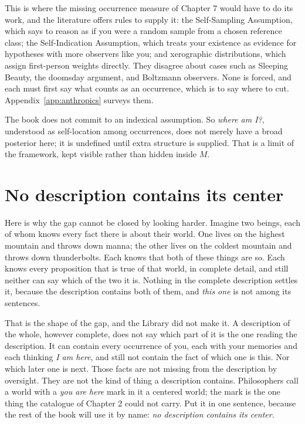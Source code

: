 This is where the missing occurrence measure of Chapter 7 would have to do its work, and the literature offers rules to supply it: the Self-Sampling Assumption, which says to reason as if you were a random sample from a chosen reference class; the Self-Indication Assumption, which treats your existence as evidence for hypotheses with more observers like you; and xerographic distributions, which assign first-person weights directly. They disagree about cases such as Sleeping Beauty, the doomsday argument, and Boltzmann observers. None is forced, and each must first say what counts as an occurrence, which is to say where to cut. Appendix~\ref{app:anthropics} surveys them.

The book does not commit to an indexical assumption. So \emph{where am I?}, understood as self-location among occurrences, does not merely have a broad posterior here; it is undefined until extra structure is supplied. That is a limit of the framework, kept visible rather than hidden inside $M$.

\section*{No description contains its center}

Here is why the gap cannot be closed by looking harder. Imagine two beings, each of whom knows every fact there is about their world. One lives on the highest mountain and throws down manna; the other lives on the coldest mountain and throws down thunderbolts. Each knows that both of these things are so. Each knows every proposition that is true of that world, in complete detail, and still neither can say which of the two it is. Nothing in the complete description settles it, because the description contains both of them, and \emph{this one} is not among its sentences.

That is the shape of the gap, and the Library did not make it. A description of the whole, however complete, does not say which part of it is the one reading the description. It can contain every occurrence of you, each with your memories and each thinking \emph{I am here}, and still not contain the fact of which one is this. Nor which later one is next. Those facts are not missing from the description by oversight. They are not the kind of thing a description contains. Philosophers call a world with a \emph{you are here} mark in it a centered world; the mark is the one thing the catalogue of Chapter 2 could not carry. Put it in one sentence, because the rest of the book will use it by name: \emph{no description contains its center}.

